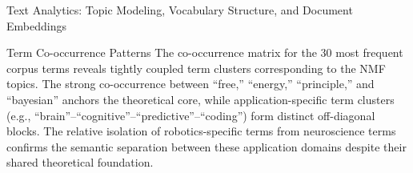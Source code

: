 \documentclass[
  ignorenonframetext,
]{beamer}
\begin{document}
\begin{frame}{Text Analytics: Topic Modeling, Vocabulary Structure, and
Document Embeddings \label{sec:text_analytics}}
\begin{block}{Term Co-occurrence Patterns}
The co-occurrence matrix for the 30 most frequent corpus terms reveals
tightly coupled term clusters corresponding to the NMF topics. The
strong co-occurrence between ``free,'' ``energy,'' ``principle,'' and
``bayesian'' anchors the theoretical core, while application-specific
term clusters (e.g.,
``brain''--``cognitive''--``predictive''--``coding'') form distinct
off-diagonal blocks. The relative isolation of robotics-specific terms
from neuroscience terms confirms the semantic separation between these
application domains despite their shared theoretical foundation.
\end{block}
\end{frame}
\end{document}
